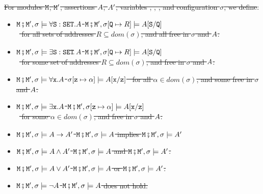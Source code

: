 \begin{definition}  
\label{def:valid:assertion:logical}
\sout{For modules $\M$, $\M'$, assertions $\A$, $\A'$, variables , , ,  and configuration $\sigma$, we define$:$}
\begin{itemize}
\item\sout{
$\M\mkpair \M', \sigma \models \forall \prg{S}:\prg{SET}.\A$ \IFF  $\M\mkpair \M', \sigma[\prg{Q}\mapsto R] \models  \A[\prg{S}/\prg{Q}]$ \\
$\strut ~ $ \hfill for all sets of addresses $R\subseteq dom(\sigma)$, and  all  free in $\sigma$ and $\A$.}
\item\sout{
$\M\mkpair \M', \sigma \models \exists \prg{S}:\prg{SET}\!.\,\A$ \IFF  $\M\mkpair \M', \sigma[\prg{Q}\mapsto R] \models  \A[\prg{S}/\prg{Q}]$ \\
 $\strut ~ $ \hfill  for some set of addresses $R\subseteq dom(\sigma)$, and    free in $\sigma$ and $\A$.}
\item\sout{
$\M\mkpair \M', \sigma \models \forall \prg{x}.\A$ \IFF
$\sigma[\prg{z}\mapsto \alpha] \models  \A[\prg{x}/\prg{z}]$ \ for all  $\alpha\in dom(\sigma)$, and  some  free in $\sigma$ and $\A$.}
\item\sout{
$\M\mkpair \M', \sigma \models \exists \prg{x}.\A$ \IFF
$\M\mkpair \M', \sigma[\prg{z}\mapsto \alpha] \models  \A[\prg{x}/\prg{z}]$\\
$\strut ~ $ \hfill for some  $\alpha\in dom(\sigma)$, and    free in $\sigma$ and $\A$.}
\item\sout{
$\M\mkpair \M', \sigma \models \A \rightarrow \A' $ \IFF  $\M\mkpair \M', \sigma \models \A $ implies $\M\mkpair \M', \sigma \models \A' $}
\item\sout{
$\M\mkpair \M', \sigma \models  \A \wedge \A'$   \IFF  $\M\mkpair \M', \sigma \models  \A $
and $\M\mkpair \M', \sigma \models  \A'$.}
\item\sout{
$\M\mkpair \M', \sigma \models  \A \vee \A'$   \IFF  $\M\mkpair \M', \sigma \models  \A $
or $\M\mkpair \M', \sigma \models  \A'$.}
\item\sout{
$\M\mkpair \M', \sigma \models  \neg\A$   \IFF  $\M\mkpair \M', \sigma \models  \A $
does not hold.}
\end{itemize}
\end{definition}


